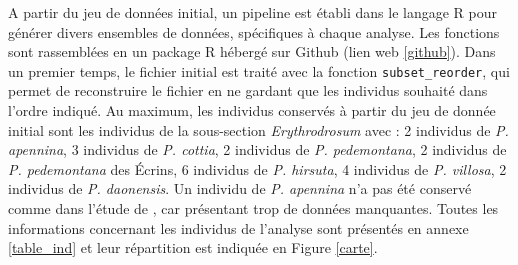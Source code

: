 A partir du jeu de données initial, un pipeline est établi dans le langage R \citep{RTeam2017} pour générer divers ensembles de données, spécifiques à chaque analyse. Les fonctions sont rassemblées en un package R hébergé sur Github (lien web \ref{github}). Dans un premier temps, le fichier initial est traité avec la fonction \verb|subset_reorder|, qui permet de reconstruire le fichier en ne gardant que les individus souhaité dans l'ordre indiqué. Au maximum, les individus conservés à partir du jeu de donnée initial sont les individus de la sous-section \textit{Erythrodrosum} avec :
2 individus de \textit{P. apennina}, 
3 individus de \textit{P. cottia}, 
2 individus de \textit{P. pedemontana}, 
2 individus de \textit{P. pedemontana} des Écrins, 
6 individus de \textit{P. hirsuta}, 
4 individus de \textit{P. villosa}, 
2 individus de \textit{P. daonensis}.
Un individu de \textit{P. apennina} n'a pas été conservé comme dans l'étude de \citet{Boucher2016a}, car présentant trop de données manquantes. Toutes les informations concernant les individus de l'analyse sont présentés en annexe \ref{table_ind} et leur répartition est indiquée en Figure \ref{carte}.
 
